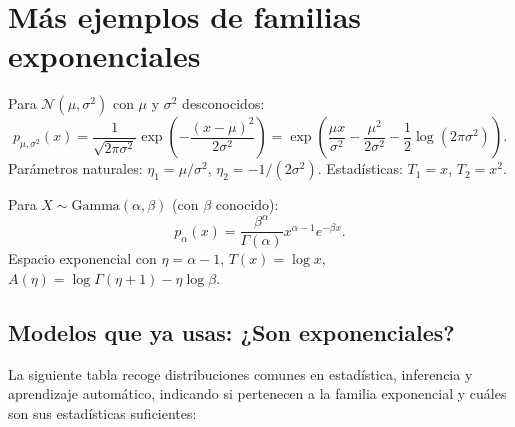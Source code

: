 \begin{center}
\end{center}

\section{Más ejemplos de familias exponenciales}

\begin{example}
	Para $\mathcal{N}(\mu, \sigma^2)$ con $\mu$ y $\sigma^2$ desconocidos:
	\[
	p_{\mu,\sigma^2}(x) = \frac{1}{\sqrt{2\pi\sigma^2}} \exp\!\left(-\frac{(x-\mu)^2}{2\sigma^2}\right)
	= \exp\!\left(\frac{\mu x}{\sigma^2} - \frac{\mu^2}{2\sigma^2} - \frac{1}{2}\log(2\pi\sigma^2)\right).
	\]
	Parámetros naturales: $\eta_1 = \mu/\sigma^2$, $\eta_2 = -1/(2\sigma^2)$.  Estadísticas: $T_1 = x$, $T_2 = x^2$.
\end{example}

\begin{example}[Gamma]
	Para $X \sim \mathrm{Gamma}(\alpha, \beta)$ (con $\beta$ conocido):
	\[
	p_\alpha(x) = \frac{\beta^\alpha}{\Gamma(\alpha)} x^{\alpha-1} e^{-\beta x}.
	\]
	Espacio exponencial con $\eta = \alpha - 1$, $T(x) = \log x$, $A(\eta) = \log\Gamma(\eta+1) - \eta\log\beta$.
\end{example}

\subsection*{Modelos que ya usas: ¿Son exponenciales?}

La siguiente tabla recoge distribuciones comunes en estadística, inferencia y aprendizaje automático, indicando si pertenecen a la familia exponencial y cuáles son sus estadísticas suficientes:

